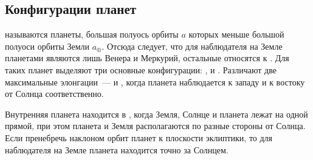 \subsection{Конфигурации планет}
 называются планеты, большая полуось орбиты
$a$ которых меньше большой полуоси орбиты Земли $a_\oplus$. Отсюда следует, что для наблюдателя на Земле  планетами являются лишь Венера и Меркурий, остальные относятся к . Для таких планет выделяют три основные конфигурации: ,  и . Различают две максимальные элонгации~---  и , когда планета наблюдается к западу и к востоку от Солнца соответственно.

Внутренняя планета находится в , когда Земля, Солнце и планета лежат на одной прямой, при этом планета и Земля располагаются по разные стороны от Солнца. Если пренебречь наклоном орбит планет к плоскости эклиптики, то для наблюдателя на Земле планета находится точно за Солнцем.

